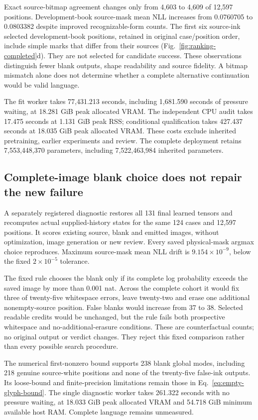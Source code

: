 Exact source-bitmap agreement changes only from 4,603 to 4,609 of 12,597
positions. Development-book source-mask mean NLL increases from 0.0760705 to
0.0803382 despite improved recognizable-form counts. The first six source-ink
selected development-book positions, retained in original case/position order,
include simple marks that differ from their sources
(Fig.~\ref{fig:ranking-completed}d). They are not selected for candidate success.
These observations distinguish fewer blank outputs, shape readability and
source fidelity. A bitmap mismatch alone does not determine whether a complete
alternative continuation would be valid language.

The fit worker takes 77,431.213 seconds, including 1,681.590 seconds of pressure
waiting, at 18.281 GiB peak allocated VRAM. The independent CPU audit takes
17.475 seconds at 1.131 GiB peak RSS; conditional qualification takes 427.437
seconds at 18.035 GiB peak allocated VRAM. These costs exclude inherited
pretraining, earlier experiments and review. The complete deployment retains
7,553,448,370 parameters, including 7,522,463,984 inherited parameters.

\subsection*{Complete-image blank choice does not repair the new failure}

A separately registered diagnostic restores all 131 final learned tensors and
recomputes actual supplied-history states for the same 124 cases and 12,597
positions. It scores existing source, blank and emitted images, without
optimization, image generation or new review. Every saved physical-mask argmax
choice reproduces. Maximum source-mask mean NLL drift is
$9.154\times10^{-9}$, below the fixed $2\times10^{-5}$ tolerance.

The fixed rule chooses the blank only if its complete log probability exceeds
the saved image by more than 0.001 nat. Across the complete cohort it would fix
three of twenty-five whitespace errors, leave twenty-two and erase one
additional nonempty-source position. False blanks would increase from 37 to
38. Selected readable credits would be unchanged, but the rule fails both
prospective whitespace and no-additional-erasure conditions. These are
counterfactual counts; no original output or verdict changes. They reject this
fixed comparison rather than every possible search procedure.

The numerical first-nonzero bound supports 238 blank global modes, including
218 genuine source-white positions and none of the twenty-five false-ink
outputs. Its loose-bound and finite-precision limitations remain those in
Eq.~\ref{eq:empty-glyph-bound}. The single diagnostic worker takes 261.322
seconds with no pressure waiting, at 18.033 GiB peak allocated VRAM and
54.718 GiB minimum available host RAM. Complete language remains unmeasured.
